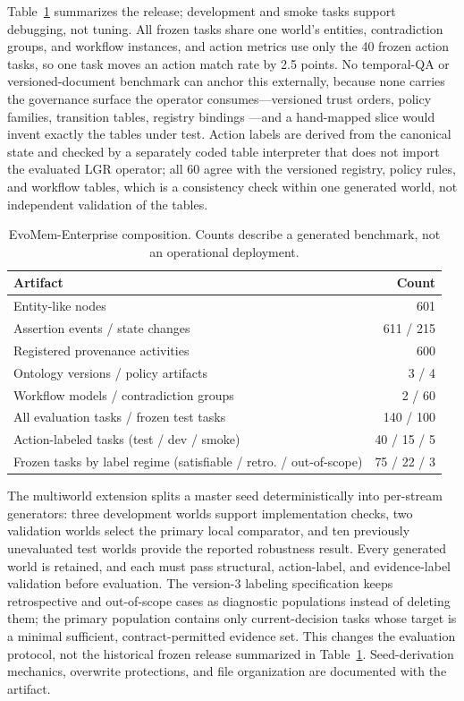 \documentclass[conference]{IEEEtran}
\newcommand{\lgr}{\textsc{LGR}\xspace}
\begin{document}
Table~\ref{tab:benchmark} summarizes the release; development and smoke tasks support debugging, not tuning. All frozen tasks share one world's entities, contradiction groups, and workflow instances, and action metrics use only the 40 frozen action tasks, so one task moves an action match rate by 2.5 points. No temporal-QA or versioned-document benchmark can anchor this externally, because none carries the governance surface the operator consumes---versioned trust orders, policy families, transition tables, registry bindings \cite{tgb,versionrag}---and a hand-mapped slice would invent exactly the tables under test. Action labels are derived from the canonical state and checked by a separately coded table interpreter that does not import the evaluated \lgr operator; all 60 agree with the versioned registry, policy rules, and workflow tables, which is a consistency check within one generated world, not independent validation of the tables.

\begin{table}[t]
\caption{EvoMem-Enterprise composition. Counts describe a generated benchmark, not an operational deployment.}
\label{tab:benchmark}
\centering\footnotesize\renewcommand{\arraystretch}{0.98}
\begin{tabularx}{\columnwidth}{@{}Xr@{}}
\toprule
\textbf{Artifact} & \textbf{Count}\\
\midrule
Entity-like nodes & 601\\
Assertion events / state changes & 611 / 215\\
Registered provenance activities & 600\\
Ontology versions / policy artifacts & 3 / 4\\
Workflow models / contradiction groups & 2 / 60\\
All evaluation tasks / frozen test tasks & 140 / 100\\
Action-labeled tasks (test / dev / smoke) & 40 / 15 / 5\\
Frozen tasks by label regime (satisfiable / retro. / out-of-scope) & 75 / 22 / 3\\
\bottomrule
\end{tabularx}
\end{table}

The multiworld extension splits a master seed deterministically into per-stream generators: three development worlds support implementation checks, two validation worlds select the primary local comparator, and ten previously unevaluated test worlds provide the reported robustness result. Every generated world is retained, and each must pass structural, action-label, and evidence-label validation before evaluation. The version-3 labeling specification keeps retrospective and out-of-scope cases as diagnostic populations instead of deleting them; the primary population contains only current-decision tasks whose target is a minimal sufficient, contract-permitted evidence set. This changes the evaluation protocol, not the historical frozen release summarized in Table~\ref{tab:benchmark}. Seed-derivation mechanics, overwrite protections, and file organization are documented with the artifact.
\end{document}

